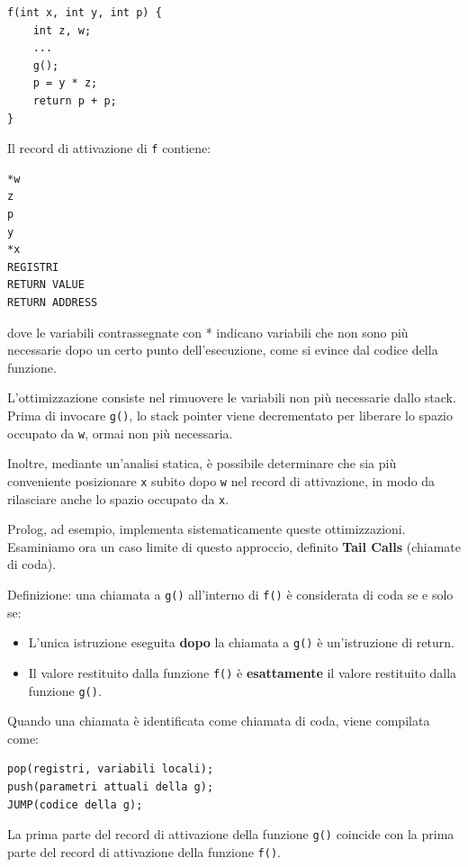 \documentclass{article}
\begin{document}
\begin{tcolorbox}
\begin{verbatim}
f(int x, int y, int p) {
    int z, w;
    ...
    g();
    p = y * z;
    return p + p;
}
\end{verbatim}
\end{tcolorbox}

Il record di attivazione di \texttt{f} contiene:
\begin{verbatim}
*w
z
p
y
*x
REGISTRI
RETURN VALUE
RETURN ADDRESS
\end{verbatim}
dove le variabili contrassegnate con * indicano variabili che non sono più necessarie dopo un certo punto dell'esecuzione, come si evince dal codice della funzione.

L'ottimizzazione consiste nel rimuovere le variabili non più necessarie dallo stack. Prima di invocare \texttt{g()}, lo stack pointer viene decrementato per liberare lo spazio occupato da \texttt{w}, ormai non più necessaria.

Inoltre, mediante un'analisi statica, è possibile determinare che sia più conveniente posizionare \texttt{x} subito dopo \texttt{w} nel record di attivazione, in modo da rilasciare anche lo spazio occupato da \texttt{x}.

Prolog, ad esempio, implementa sistematicamente queste ottimizzazioni.\vspace{14pt}\\
Esaminiamo ora un caso limite di questo approccio, definito \textbf{Tail Calls} (chiamate di coda).

Definizione: una chiamata a \texttt{g()} all'interno di \texttt{f()} è considerata di coda se e solo se:
\begin{itemize}
    \item L'unica istruzione eseguita \textbf{dopo} la chiamata a \texttt{g()} è un'istruzione di return.
    \item Il valore restituito dalla funzione \texttt{f()} è \textbf{esattamente} il valore restituito dalla funzione \texttt{g()}.
\end{itemize}

Quando una chiamata è identificata come chiamata di coda, viene compilata come:
\begin{tcolorbox}
\begin{verbatim}
pop(registri, variabili locali);
push(parametri attuali della g);
JUMP(codice della g);
\end{verbatim}
\end{tcolorbox}
La prima parte del record di attivazione della funzione \texttt{g()} coincide con la prima parte del record di attivazione della funzione \texttt{f()}.
\end{document}
